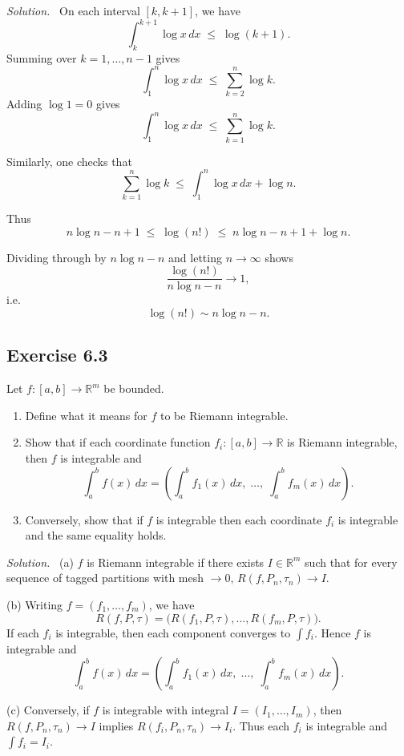 \documentclass[11pt,a4paper]{article}
\newenvironment{solution}{\par\noindent\textit{Solution.}\ }{\par\vspace{0.5em}}
\begin{document}
\begin{solution}
	On each interval $[k,k+1]$, we have
	\[
	\int_k^{k+1} \log x\,dx \;\leq\; \log(k+1).
	\]
	Summing over $k=1,\dots,n-1$ gives
	\[
	\int_1^n \log x\,dx \;\leq\; \sum_{k=2}^n \log k.
	\]
	Adding $\log 1=0$ gives
	\[
	\int_1^n \log x\,dx \;\leq\; \sum_{k=1}^n \log k.
	\]
	
	Similarly, one checks that
	\[
	\sum_{k=1}^n \log k \;\leq\; \int_1^n \log x\,dx + \log n.
	\]
	
	Thus
	\[
	n\log n - n + 1 \;\leq\; \log(n!) \;\leq\; n\log n - n + 1 + \log n.
	\]
	
	Dividing through by $n\log n - n$ and letting $n\to\infty$ shows
	\[
	\frac{\log(n!)}{n\log n - n} \to 1,
	\]
	i.e.
	\[
	\log(n!) \sim n\log n - n.
	\]
\end{solution}


\subsection*{Exercise 6.3}
Let $f:[a,b]\to\mathbb{R}^m$ be bounded.

\begin{enumerate}[label=\alph*)]
	\item Define what it means for $f$ to be Riemann integrable.
	\item Show that if each coordinate function $f_i:[a,b]\to\mathbb{R}$ is Riemann integrable, 
	then $f$ is integrable and
	\[
	\int_a^b f(x)\,dx = \left(\int_a^b f_1(x)\,dx,\;\dots,\;\int_a^b f_m(x)\,dx\right).
	\]
	\item Conversely, show that if $f$ is integrable then each coordinate $f_i$ is integrable 
	and the same equality holds.
\end{enumerate}

\begin{solution}
	(a) $f$ is Riemann integrable if there exists $I\in\mathbb{R}^m$ such that for every 
	sequence of tagged partitions with mesh $\to 0$, $R(f,P_n,\tau_n)\to I$.
	
	(b) Writing $f=(f_1,\dots,f_m)$, we have
	\[
	R(f,P,\tau) = \big(R(f_1,P,\tau),\dots,R(f_m,P,\tau)\big).
	\]
	If each $f_i$ is integrable, then each component converges to $\int f_i$. 
	Hence $f$ is integrable and
	\[
	\int_a^b f(x)\,dx = \left(\int_a^b f_1(x)\,dx,\;\dots,\;\int_a^b f_m(x)\,dx\right).
	\]
	
	(c) Conversely, if $f$ is integrable with integral $I=(I_1,\dots,I_m)$, then 
	$R(f,P_n,\tau_n)\to I$ implies $R(f_i,P_n,\tau_n)\to I_i$. 
	Thus each $f_i$ is integrable and $\int f_i=I_i$.
\end{solution}
\end{document}
